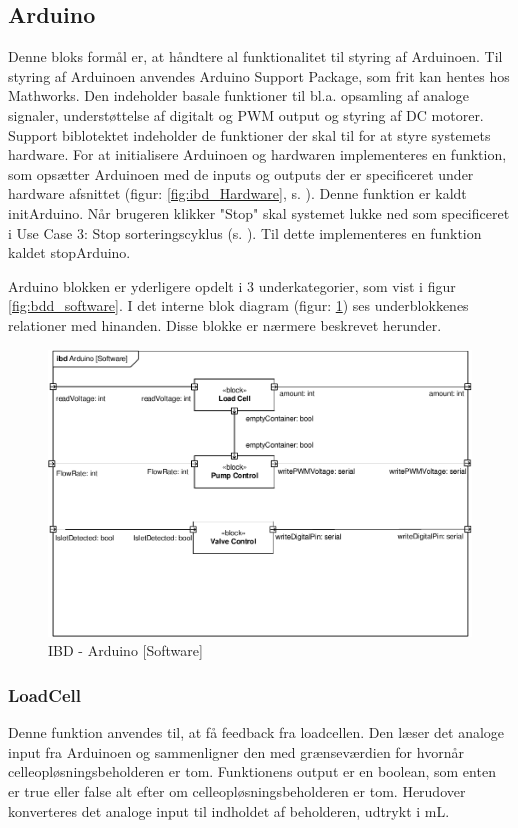 \subsection{Arduino}
Denne bloks formål er, at håndtere al funktionalitet til styring af Arduinoen. Til styring af Arduinoen anvendes Arduino Support Package, som frit kan hentes hos Mathworks. Den indeholder basale funktioner til bl.a. opsamling af analoge signaler, understøttelse af digitalt og PWM output og styring af DC motorer. Support biblotektet indeholder de funktioner der skal til for at styre systemets hardware.
For at initialisere Arduinoen og hardwaren implementeres en funktion, som opsætter Arduinoen med de inputs og outputs der er specificeret under hardware afsnittet (figur: \ref{fig:ibd_Hardware}, s. \pageref{fig:ibd_Hardware}). Denne funktion er kaldt initArduino. Når brugeren klikker "Stop" skal systemet lukke ned som specificeret i Use Case 3: Stop sorteringscyklus (s. \pageref{uc:3}). Til dette implementeres en funktion kaldet stopArduino. 

\newpage

Arduino blokken er yderligere opdelt i 3 underkategorier, som vist i figur \ref{fig:bdd_software}. I det interne blok diagram (figur: \ref{fig:ibd_software_arduino}) ses underblokkenes relationer med hinanden. Disse blokke er nærmere beskrevet herunder.  
\begin{figure}[H]
	\centering
	\includegraphics[width=1\textwidth]{billeder/IBD_Software_Arduino-crop.pdf}
	\caption{IBD - Arduino [Software]}
	\label{fig:ibd_software_arduino}
\end{figure}
\subsubsection{LoadCell}
Denne funktion anvendes til, at få feedback fra loadcellen. Den læser det analoge input fra Arduinoen og sammenligner den med grænseværdien for hvornår celleopløsningsbeholderen er tom. Funktionens output er en boolean, som enten er true eller false alt efter om celleopløsningsbeholderen er tom. Herudover konverteres det analoge input til indholdet af beholderen, udtrykt i mL.
